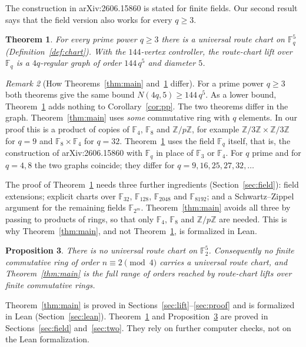 \documentclass[11pt]{article}
\newtheorem{theorem}{Theorem}
\newtheorem{proposition}[theorem]{Proposition}
\theoremstyle{definition}
\theoremstyle{remark}
\newtheorem{remark}[theorem]{Remark}
\newcommand{\F}{\mathbb{F}}
\newcommand{\Z}{\mathbb{Z}}
\begin{document}
The construction in arXiv:2606.15860 is stated for finite fields. Our second
result says that the field version also works for every $q\ge 3$.

\begin{theorem}\label{thm:field}
For every prime power $q\ge 3$ there is a universal route chart on $\F_q^5$
(Definition~\ref{def:chart}). With the $144$-vertex controller, the route-chart lift over
$\F_q$ is a $4q$-regular graph of order $144\,q^5$ and diameter $5$.
\end{theorem}

\begin{remark}[How Theorems~\ref{thm:main} and~\ref{thm:field} differ]\label{rem:diff}
For a prime power $q\ge 3$ both theorems give the same bound
$N(4q,5)\ge 144\,q^5$. As a lower bound, Theorem~\ref{thm:field} adds nothing to
Corollary~\ref{cor:pp}. The two theorems differ in the graph.
Theorem~\ref{thm:main} uses \emph{some} commutative ring with $q$ elements. In our
proof this is a product of copies of $\F_4$, $\F_8$ and $\Z/p\Z$, for example
$\Z/3\Z\times\Z/3\Z$ for $q=9$ and $\F_8\times\F_4$ for $q=32$.
Theorem~\ref{thm:field} uses the field $\F_q$ itself, that is, the construction of
arXiv:2606.15860 with $\F_q$ in place of $\F_3$ or $\F_4$. For $q$ prime and for
$q=4,8$ the two graphs coincide; they differ for $q=9,16,25,27,32,\dots$

The proof of Theorem~\ref{thm:field} needs three further ingredients
(Section~\ref{sec:field}): field extensions; explicit charts over $\F_{32}$,
$\F_{128}$, $\F_{2048}$ and $\F_{8192}$; and a Schwartz--Zippel argument for the
remaining fields $\F_{2^m}$. Theorem~\ref{thm:main} avoids all three by passing to
products of rings, so that only $\F_4$, $\F_8$ and $\Z/p\Z$ are needed. This is why
Theorem~\ref{thm:main}, and not Theorem~\ref{thm:field}, is formalized in Lean.
\end{remark}

\begin{proposition}\label{prop:two}
There is no universal route chart on $\F_2^5$. Consequently no finite
commutative ring of order $n\equiv 2\pmod 4$ carries a universal route chart,
and Theorem~\ref{thm:main} is the full range of orders reached by route-chart
lifts over finite commutative rings.
\end{proposition}

Theorem~\ref{thm:main} is proved in Sections~\ref{sec:lift}--\ref{sec:proof} and is
formalized in Lean (Section~\ref{sec:lean}). Theorem~\ref{thm:field} and
Proposition~\ref{prop:two} are proved in Sections~\ref{sec:field}
and~\ref{sec:two}. They rely on further computer checks, not on the Lean
formalization.
\end{document}
